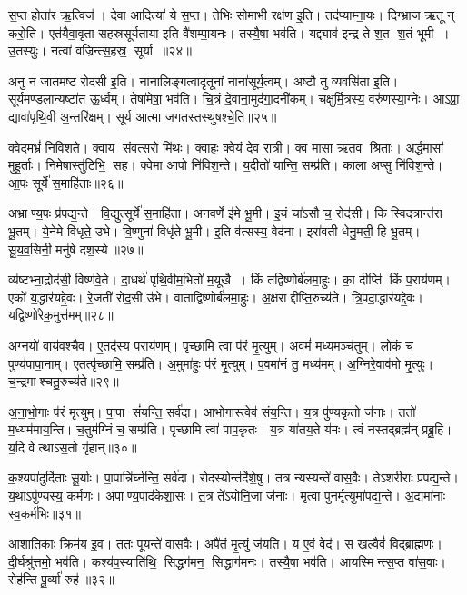 स॒प्त होता॑र ऋ॒त्विज॑। देवा आदित्या॑ ये स॒प्त। 
तेभिः सोमाभी रक्ष॑ण इ॒ति। तद॑प्याम्ना॒यः। 
दिग्भ्राज ऋतून्‌ करो॒ति। एत॑यैवा॒वृता सहस्रसूर्यताया इति वै॑शम्पा॒यनः। 
तस्यै॒षा भव॑ति। यद्द्याव॑ इन्द्र ते श॒त श॒तं भूमी। 
उ॒तस्युः। नत्वा॑ वज्रिन्त्स॒हस्र॒ सूर्या॥२४॥

अनु न जातमष्ट रोद॑सी इ॒ति। नानालिङ्गत्वादृतूनां नाना॑सूर्य॒त्वम्। 
अष्टौ तु व्यवसि॑ता इ॒ति। सूर्यमण्डलान्यष्टा॑त ऊ॒र्ध्वम्‌। 
तेषा॑मेषा॒ भव॑ति। चि॒त्रं दे॒वाना॒मुद॑गा॒दनी॑कम्। 
चक्षु॑र्मि॒त्रस्य॒ वरु॑णस्या॒ग्नेः। आऽप्रा॒ द्यावा॑पृथि॒वी अ॒न्तरि॑क्षम्। 
सूर्य आत्मा जगतस्तस्थु॑षश्चे॒ति॥२५॥\anuvakamend


क्वेदमभ्रं॑ निवि॒शते। क्वाय संवत्स॒रो मि॑थः। 
क्वाहः क्वेयं दे॑व रा॒त्री। क्व मासा ऋ॑तव॒ श्रिताः। 
अर्द्धमासा॑ मुहू॒र्ताः। निमेषास्तु॑टिभि॒ सह। 
क्वेमा आपो नि॑विश॒न्ते। य॒दीतो॑ यान्ति॒ सम्प्र॑ति। 
काला अप्सु नि॑विश॒न्ते। आ॒पः सूर्ये॑ स॒माहि॑ताः॥२६॥

अभ्राण्य॒पः प्र॑पद्य॒न्ते। वि॒द्युत्सूर्ये॑ स॒माहि॑ता। 
अनवर्णे इ॑मे भू॒मी। इ॒यं चा॑ऽसौ च॒ रोद॑सी। 
किस्विदत्रान्त॑रा भू॒तम्। ये॒नेमे वि॑धृते॒ उभे। 
वि॒ष्णुना॑ विधृ॑ते भू॒मी। इ॒ति व॑त्सस्य॒ वेद॑ना। 
इरा॑वती धेनु॒मती॒ हि भू॒तम्‌। सू॒य॒व॒सिनी॒ मनु॑षे दश॒स्ये॥२७॥

व्य॑ष्टभ्ना॒द्रोद॑सी॒ विष्ण॑वे॒ते। दा॒धर्थ॑ पृथि॒वीम॒भितो॑ म॒यूखै। 
किं तद्विष्णोर्ब॑ल\-मा॒हुः। का॒ दीप्ति॑ किं प॒राय॑णम्‌। 
एको॑ य॒द्धार॑यद्दे॒वः। रे॒जती॑ रोद॒सी उ॑भे। 
वाताद्विष्णोर्ब॑लमा॒हुः। अ॒क्षराद्दीप्ति॒रुच्य॑ते। 
त्रि॒पदा॒द्धार॑यद्दे॒वः। यद्विष्णो॑रेक॒मुत्त॑मम्‌॥२८॥

अ॒ग्नयो॑ वाय॑वश्चै॒व। ए॒तद॑स्य प॒राय॑णम्‌। 
पृच्छामि त्वा प॑रं मृ॒त्युम्‌। अ॒वमं॑ मध्य॒मञ्च॑तुम्‌। 
लो॒कं च॒ पुण्य॑पापा॒नाम्‌। ए॒तत्पृ॑च्छामि॒ सम्प्र॑ति। 
अ॒मुमा॑हुः प॑रं मृ॒त्युम्‌। प॒वमा॑नं तु॒ मध्य॑मम्‌। 
अ॒ग्निरे॒वाव॑मो मृ॒त्युः। च॒न्द्रमाश्चतु॒रुच्य॑ते॥२९॥

अ॒ना॒भो॒गाः प॑रं मृ॒त्युम्‌। पा॒पा सं॑यन्ति॒ सर्व॑दा। 
आभोगास्त्वेव॑ संय॒न्ति। य॒त्र पु॑ण्यकृ॒तो ज॑नाः। 
ततो॑ म॒ध्यम॑माय॒न्ति। च॒तुम॑ग्निं च॒ सम्प्र॑ति। 
पृच्छामि त्वा॑ पाप॒कृतः। य॒त्र या॑तय॒ते य॑मः। 
त्वं नस्तद्ब्रह्म॑न्‌ प्रब्रू॒हि। य॒दि वेत्थाऽस॒तो गृ॑हान्‌॥३०॥

क॒श्यपा॑दुदि॑ताः सू॒र्याः। पा॒पान्नि॑र्घ्नन्ति॒ सर्व॑दा। 
रोदस्योन्त॑र्देशे॒षु। तत्र न्यस्यन्ते॑ वास॒वैः। 
तेऽशरीराः प्र॑पद्य॒न्ते। य॒थाऽपु॑ण्यस्य॒ कर्म॑णः। 
अपाण्य॒पाद॑केशा॒सः। त॒त्र ते॑ऽयोनि॒जा ज॑नाः। 
मृत्वा पुनर्मृत्युमा॑पद्य॒न्ते। अ॒द्यमा॑नाः स्व॒कर्म॑भिः॥३१॥

आशातिकाः क्रिम॑य इ॒व। ततः पूयन्ते॑ वास॒वैः। अपै॑तं मृ॒त्युं ज॑यति। 
य ए॒वं वेद॑। स खल्वैवं॑ विद्ब्रा॒ह्मणः। दी॒र्घश्रु॑त्तमो॒ भव॑ति। 
कश्य॑प॒स्याति॑थि॒ सिद्धग॑मन॒ सिद्धाग॑मनः। तस्यै॒षा भव॑ति। 
आयस्मिन्त्स॒प्त वा॑स॒वाः। रोह॑न्ति पू॒र्व्या॑ रुह॑॥३२॥

